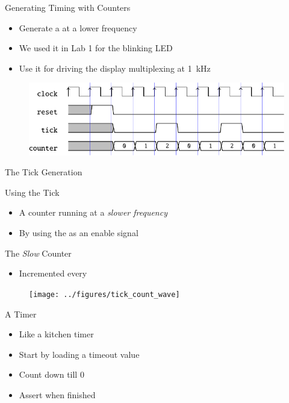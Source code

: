 \begin{frame}[fragile]{Generating Timing with Counters}
\begin{itemize}
\item Generate a  at a lower frequency
\item We used it in Lab 1 for the blinking LED
\item Use it for driving the display multiplexing at 1~kHz
\end{itemize}
\begin{figure}
  \includegraphics[scale=0.8]{../figures/tick_wave}
\end{figure}
\end{frame}


\begin{frame}[fragile]{The Tick Generation}
\end{frame}

\begin{frame}[fragile]{Using the Tick}
\begin{itemize}
\item A counter running at a \emph{slower frequency}
\item By using the  as an enable signal
\end{itemize}
\end{frame}

\begin{frame}[fragile]{The \emph{Slow} Counter}
\begin{itemize}
\item Incremented every 
\end{itemize}
\begin{figure}
  \texttt{[image: ../figures/tick\_count\_wave]}
\end{figure}
\end{frame}

\begin{frame}[fragile]{A Timer}
\begin{itemize}
\item Like a kitchen timer
\item Start by loading a timeout value
\item Count down till 0
\item Assert  when finished
\end{itemize}
\end{frame}

